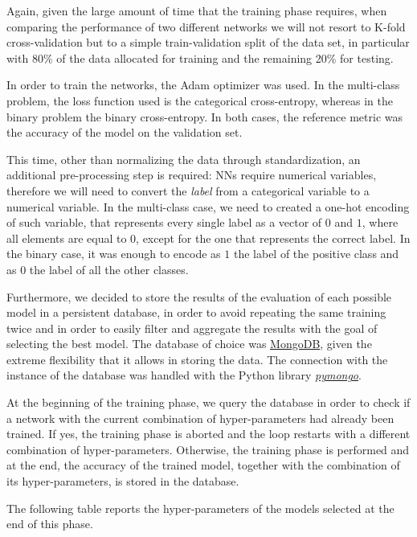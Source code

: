 \documentclass{Configuration_Files/PoliMi3i_thesis}
\begin{document}
Again, given the large amount of time that the training phase requires, when comparing the performance of two different networks we will not resort to K-fold cross-validation but to a simple train-validation split of the data set, in particular with 80\% of the data allocated for training and the remaining 20\% for testing.

In order to train the networks, the Adam optimizer was used. In the multi-class problem, the loss function used is the categorical cross-entropy, whereas in the binary problem the binary cross-entropy. 
In both cases, the reference metric was the accuracy of the model on the validation set.

This time, other than normalizing the data through standardization, an additional pre-processing step is required: NNs require numerical variables, therefore we will need to convert the \textit{label} from a categorical variable to a numerical variable. In the multi-class case, we need to created a one-hot encoding of such variable, that represents every single label as a vector of $0$ and $1$, where all elements are equal to $0$, except for the one that represents the correct label.
In the binary case, it was enough to encode as $1$ the label of the positive class and as $0$ the label of all the other classes.

Furthermore, we decided to store the results of the evaluation of each possible model in a persistent database, in order to avoid repeating the same training twice and in order to easily filter and aggregate the results with the goal of selecting the best model. The database of choice was \href{https://www.mongodb.com}{MongoDB}, given the extreme flexibility that it allows in storing the data. The connection with the instance of the database was handled with the Python library \href{https://www.mongodb.com/docs/drivers/pymongo/}{\textit{pymongo}}.

At the beginning of the training phase, we query the database in order to check if a network with the current combination of hyper-parameters had already been trained. If yes, the training phase is aborted and the loop restarts with a different combination of hyper-parameters. Otherwise, the training phase is performed and at the end, the accuracy of the trained model, together with the combination of its hyper-parameters, is stored in the database.

The following table reports the hyper-parameters of the models selected at the end of this phase.
\end{document}
